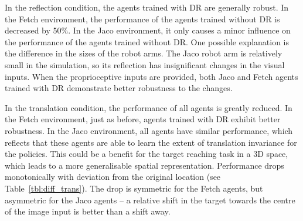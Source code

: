 In the reflection condition, the agents trained with DR are generally robust. In the Fetch environment, the performance of the agents trained without DR is decreased by 50$\%$. In the Jaco environment, it only causes a minor influence on the performance of the agents trained without DR. One possible explanation is the difference in the sizes of the robot arms. The Jaco robot arm is relatively small in the simulation, so its reflection has insignificant changes in the visual inputs. When the proprioceptive inputs are provided, both Jaco and Fetch agents trained with DR demonstrate better robustness to the changes.

In the translation condition, the performance of all agents is greatly reduced. In the Fetch environment, just as before, agents trained with DR exhibit better robustness. In the Jaco environment, all agents have similar performance, which reflects that these agents are able to learn the extent of translation invariance for the policies. This could be a benefit for the target reaching task in a 3D space, which leads to a more generalisable spatial representation. Performance drops monotonically with deviation from the original location (see Table~\ref{tbl:diff_trans}). The drop is symmetric for the Fetch agents, but asymmetric for the Jaco agents -- a relative shift in the target towards the centre of the image input is better than a shift away.

